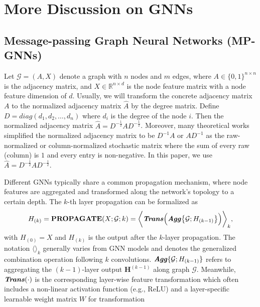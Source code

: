 \section{More Discussion on GNNs}
\label{app: GNNs}

\subsection{Message-passing Graph Neural Networks (MP-GNNs)}
Let $\mathcal{G}=(A, X)$ denote a graph with $n$ nodes and $m$ edges, where $A \in \{0,1\}^{n\times n}$ is the adjacency matrix, and $X\in \mathbb{R}^{n \times d}$ is the node feature matrix with a node feature dimension of $d$.
Usually, we will transform the concrete adjacency matrix $A$ to the normalized adjacency matrix $\hat{A}$ by the degree matrix.
Define $D=diag(d_1,d_2, \dots, d_n)$ where $d_i$ is the degree of the node $i$.
Then the normalized adjacency matrix $\hat{A}=D^{-\frac{1}{2}}AD^{-\frac{1}{2}}$.
Moreover, many theoretical works simplified the normalized adjacency matrix to be $D^{-1}A$ or $AD^{-1}$ as the raw-normalized or column-normalized stochastic matrix where the sum of every raw (column) is $1$ and every entry is non-negative. 
In this paper, we use $\hat{A}=D^{-\frac{1}{2}}AD^{-\frac{1}{2}}$.

Different GNNs typically share a common propagation mechanism, where node features are aggregated and transformed along the network's topology to a certain depth.
The $k$-th layer propagation can be formalized as
\begin{equation}
        \label{Ana_eq_propagation_1}
	\begin{aligned}
	H_{(k)} = \textbf{PROPAGATE}(X; \mathcal{G}; k) =\bigg\langle\textbf{\textit{Trans}}\Big(\textbf{\textit{Agg}}\big\{\mathcal{G};H_{(k-1)}\big\}\Big)\bigg\rangle_{k},
	\end{aligned}
\end{equation}
with $H_{(0)} = X$ and $H_{(k)}$ is the output after the $k$-layer propagation. 
The notation \(\langle \rangle_{k}\) generally varies from GNN models and denotes the generalized combination operation following \(k\) convolutions. 
%
\(\textbf{\textit{Agg}}\{\mathcal{G}; H_{(k-1)}\}\) refers to aggregating the $(k-1)$-layer output $\textbf{H}^{(k-1)}$ along graph $\mathcal{G}$. 
%
Meanwhile, \(\textbf{\textit{Trans}}(\cdot)\) is the corresponding layer-wise feature transformation which often includes a non-linear activation function (e.g., ReLU) and a layer-specific learnable weight matrix \(W\) for transformation

